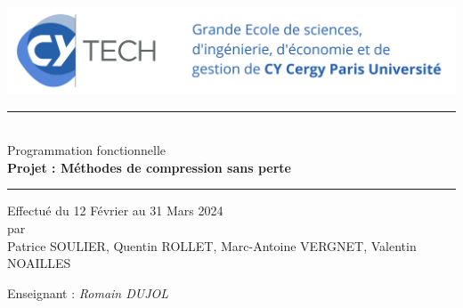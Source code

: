 \begin{titlepage}
    \thispagestyle{empty}
    \begin{center}
        \includegraphics[scale=0.1]{assets/CY_Tech.png}

        \vfill

        \rule{\textwidth}{1pt}\\[0.5cm]
        {\Huge Programmation fonctionnelle}\\[0.5cm]
        {\Large \textbf{Projet : Méthodes de compression sans perte}}\\[0.5cm]
        \rule{\textwidth}{1pt}

        \vfill

        Effectué du 12 Février au 31 Mars 2024\\[0.5cm]

        par\\[0.5cm]

        Patrice SOULIER, Quentin ROLLET, Marc-Antoine VERGNET, Valentin NOAILLES\\[0.5cm]

        
        \vfill
    
        Enseignant : \textit{Romain DUJOL}
    \end{center}
\end{titlepage}


\tableofcontents
\newpage


\pagestyle{fancy}












